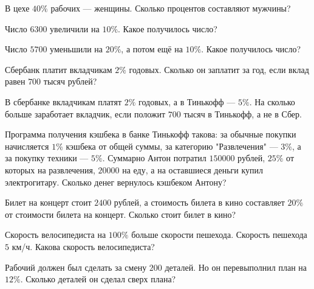 \begin{class}[number=2]
	\begin{listofex}
		\item В цехе \( 40\% \) рабочих --- женщины. Сколько процентов составляют мужчины?
		\item Число \( 6300 \) увеличили на \( 10\% \). Какое получилось число?
		\item Число \( 5700 \) уменьшили на \( 20\% \), а потом ещё на \( 10\% \). Какое получилось число?
		\item Сбербанк платит вкладчикам \( 2\% \) годовых. Сколько он заплатит за год, если вклад равен \( 700 \) тысяч рублей?
		\item В сбербанке вкладчикам платят \( 2\% \) годовых, а в Тинькофф --- \( 5\% \). На сколько больше заработает вкладчик, если положит \( 700 \) тысяч в Тинькофф, а не в Сбер.
		\item Программа получения кэшбека в банке Тинькофф такова: за обычные покупки начисляется \( 1\% \) кэшбека от общей суммы, за категорию "Развлечения" --- \( 3\% \), а за покупку техники --- \( 5\% \). Суммарно Антон потратил \( 150000 \) рублей, \( 25\% \) от которых на развлечения, \( 20000 \) на еду, а на оставшиеся деньги купил электрогитару. Сколько денег вернулось кэшбеком Антону?
		\item Билет на концерт стоит \( 2400 \) рублей, а стоимость билета в кино составляет \( 20\% \) от стоимости билета на концерт. Сколько стоит билет в кино?
		\item Скорость велосипедиста на \( 100\% \) больше скорости пешехода. Скорость пешехода \( 5 \) км/ч. Какова скорость велосипедиста?
		\item Рабочий должен был сделать за смену \( 200 \) деталей. Но он перевыполнил план на \( 12\% \). Сколько деталей он сделал сверх плана?
		\item {}
	\end{listofex}
\end{class}

